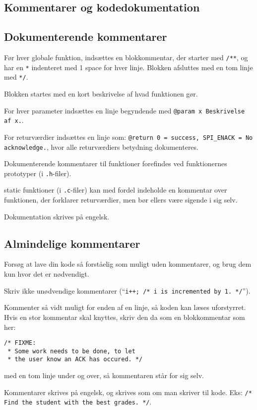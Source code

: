 \documentclass[article, 10pt]{memoir}
\let\tempone\itemize
\let\temptwo\enditemize
\renewenvironment{itemize}{\tempone\firmlist}{\temptwo}
\begin{document}
\begin{multicols}{2}
    \chapter{Kommentarer og kodedokumentation}

    \section{Dokumenterende kommentarer}
    \begin{itemize}
    \item Før hver globale funktion, indsættes en blokkommentar, der starter med \texttt{/**}, og har en \texttt{*} indenteret med 1 space for hver linje. Blokken afsluttes med en tom linje med \texttt{*/}.
    \item Blokken startes med en kort beskrivelse af hvad funktionen gør.
    \item For hver parameter indsættes en linje begyndende med \texttt{@param x Beskrivelse af x.}.
    \item For returværdier indsættes en linje som: \texttt{@return 0 = success, SPI\_ENACK = No acknowledge.}, hvor alle returværdiers betydning dokumenteres.
    \item Dokumenterende kommentarer til funktioner forefindes ved funktionernes prototyper (i \texttt{.h}-filer).
    \item static funktioner (i \texttt{.c}-filer) kan med fordel indeholde en kommentar over funktionen, der forklarer returværdier, men bør ellers være sigende i sig selv.
    \item Dokumentation skrives på engelsk.
    \end{itemize}

    \section{Almindelige kommentarer}
    \begin{itemize}
    \item Forsøg at lave din kode så forståelig som muligt uden kommentarer, og brug dem kun hvor det er nødvendigt.
    \item Skriv ikke unødvendige kommentarer (``\texttt{i++; /* i is incremented by 1. */}'').
    \item Kommenter så vidt muligt for enden af en linje, så koden kan læses uforstyrret. Hvis en stor kommentar skal knyttes, skriv den da som en blokkommentar som her:
        \begin{lstlisting}
/* FIXME:
 * Some work needs to be done, to let
 * the user know an ACK has occured. */
        \end{lstlisting}
        med en tom linje under og over, så kommentaren står for sig selv.
    \item Kommentarer skrives på engelsk, og skrives som om man skriver til kode. Eks: \texttt{/* Find the student with the best grades. */}.
    \end{itemize}


\end{multicols}
\end{document}

